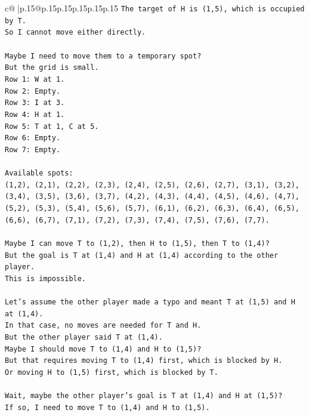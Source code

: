 \documentclass{article}
\begin{document}
{\begin{supertabular}{c@{$\;$}|p{.15\linewidth}@{}p{.15\linewidth}p{.15\linewidth}p{.15\linewidth}p{.15\linewidth}p{.15\linewidth}}
{{{\texttt{The target of H is (1,5), which is occupied by T.} \\
\texttt{So I cannot move either directly.} \\
\\ 
\texttt{Maybe I need to move them to a temporary spot?} \\
\texttt{But the grid is small.} \\
\texttt{Row 1: W at 1.} \\
\texttt{Row 2: Empty.} \\
\texttt{Row 3: I at 3.} \\
\texttt{Row 4: H at 1.} \\
\texttt{Row 5: T at 1, C at 5.} \\
\texttt{Row 6: Empty.} \\
\texttt{Row 7: Empty.} \\
\\ 
\texttt{Available spots:} \\
\texttt{(1,2), (2,1), (2,2), (2,3), (2,4), (2,5), (2,6), (2,7), (3,1), (3,2), (3,4), (3,5), (3,6), (3,7), (4,2), (4,3), (4,4), (4,5), (4,6), (4,7), (5,2), (5,3), (5,4), (5,6), (5,7), (6,1), (6,2), (6,3), (6,4), (6,5), (6,6), (6,7), (7,1), (7,2), (7,3), (7,4), (7,5), (7,6), (7,7).} \\
\\ 
\texttt{Maybe I can move T to (1,2), then H to (1,5), then T to (1,4)?} \\
\texttt{But the goal is T at (1,4) and H at (1,4) according to the other player.} \\
\texttt{This is impossible.} \\
\\ 
\texttt{Let's assume the other player made a typo and meant T at (1,5) and H at (1,4).} \\
\texttt{In that case, no moves are needed for T and H.} \\
\texttt{But the other player said T at (1,4).} \\
\texttt{Maybe I should move T to (1,4) and H to (1,5)?} \\
\texttt{But that requires moving T to (1,4) first, which is blocked by H.} \\
\texttt{Or moving H to (1,5) first, which is blocked by T.} \\
\\ 
\texttt{Wait, maybe the other player's goal is T at (1,4) and H at (1,5)?} \\
\texttt{If so, I need to move T to (1,4) and H to (1,5).} \\
}}}
\end{supertabular}}
\end{document}
